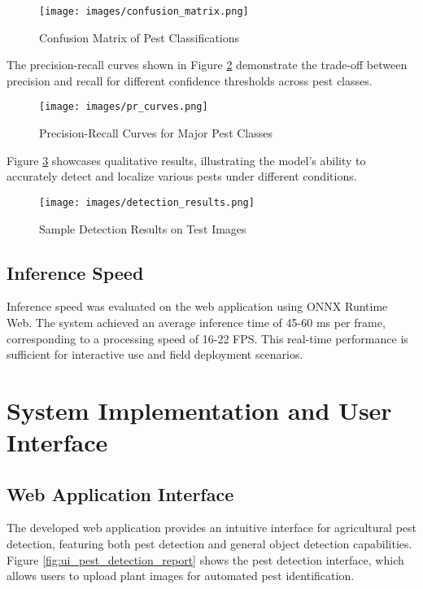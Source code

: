 \begin{figure}[H]
    \centering
    \texttt{[image: images/confusion\_matrix.png]}
    \caption{Confusion Matrix of Pest Classifications}
    \label{fig:confusion_matrix_report}
\end{figure}

The precision-recall curves shown in Figure \ref{fig:pr_curves_report} demonstrate the trade-off between precision and recall for different confidence thresholds across pest classes.

\begin{figure}[H]
    \centering
    \texttt{[image: images/pr\_curves.png]}
    \caption{Precision-Recall Curves for Major Pest Classes}
    \label{fig:pr_curves_report}
\end{figure}

Figure \ref{fig:detection_results_report} showcases qualitative results, illustrating the model's ability to accurately detect and localize various pests under different conditions.

\begin{figure}[H]
    \centering
    \texttt{[image: images/detection\_results.png]}
    \caption{Sample Detection Results on Test Images}
    \label{fig:detection_results_report}
\end{figure}

\subsection{Inference Speed}
Inference speed was evaluated on the web application using ONNX Runtime Web. The system achieved an average inference time of 45-60 ms per frame, corresponding to a processing speed of 16-22 FPS. This real-time performance is sufficient for interactive use and field deployment scenarios.

\section{System Implementation and User Interface}

\subsection{Web Application Interface}
The developed web application provides an intuitive interface for agricultural pest detection, featuring both pest detection and general object detection capabilities. Figure \ref{fig:ui_pest_detection_report} shows the pest detection interface, which allows users to upload plant images for automated pest identification.

